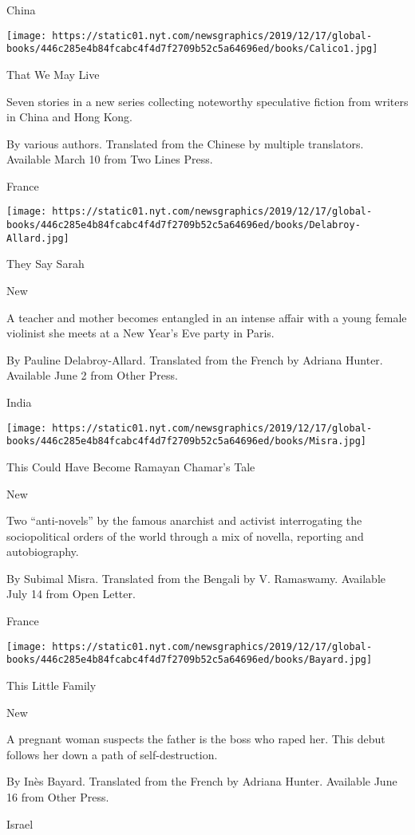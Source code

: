 China

\texttt{[image: https://static01.nyt.com/newsgraphics/2019/12/17/global-books/446c285e4b84fcabc4f4d7f2709b52c5a64696ed/books/Calico1.jpg]}

That We May Live

Seven stories in a new series collecting noteworthy speculative fiction
from writers in China and Hong Kong.

 By various authors. Translated from the Chinese by multiple
translators. Available March 10 from Two Lines Press.

France

\texttt{[image: https://static01.nyt.com/newsgraphics/2019/12/17/global-books/446c285e4b84fcabc4f4d7f2709b52c5a64696ed/books/Delabroy-Allard.jpg]}

They Say Sarah

New

A teacher and mother becomes entangled in an intense affair with a young
female violinist she meets at a New Year's Eve party in Paris.

 By Pauline Delabroy-Allard. Translated from the French by Adriana
Hunter. Available June 2 from Other Press.

India

\texttt{[image: https://static01.nyt.com/newsgraphics/2019/12/17/global-books/446c285e4b84fcabc4f4d7f2709b52c5a64696ed/books/Misra.jpg]}

This Could Have Become Ramayan Chamar's Tale

New

Two ``anti-novels'' by the famous anarchist and activist interrogating
the sociopolitical orders of the world through a mix of novella,
reporting and autobiography.

 By Subimal Misra. Translated from the Bengali by V. Ramaswamy.
Available July 14 from Open Letter.

France

\texttt{[image: https://static01.nyt.com/newsgraphics/2019/12/17/global-books/446c285e4b84fcabc4f4d7f2709b52c5a64696ed/books/Bayard.jpg]}

This Little Family

New

A pregnant woman suspects the father is the boss who raped her. This
debut follows her down a path of self-destruction.

 By Inès Bayard. Translated from the French by Adriana Hunter. Available
June 16 from Other Press.

Israel

